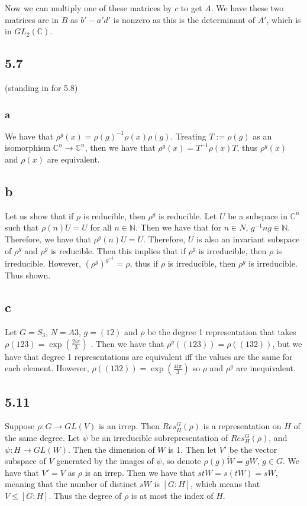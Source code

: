 \documentclass[]{article}
\begin{document}
Now we can multiply one of these matrices by $c$ to get $A$.
We have these two matrices are in $B$ as $b' - a' d' $ is nonzero as this is the determinant of $A'$, which is in $GL_2(\mathbb{C})$. 
\subsection*{5.7} (standing in for 5.8)

\subsubsection*{a}
We have that $\rho^g(x) = \rho(g)^{-1} \rho(x) \rho(g)$. Treating $T := \rho(g)$ as an isomorphism $\mathbb{C}^n \rightarrow \mathbb{C}^n$, then we have that $\rho^g(x) = T^{-1} \rho(x) T$, thus $\rho^g(x)$ and $\rho(x)$ are equivalent. 

\subsection*{b}
Let us show that if $\rho$ is reducible, then $\rho^g$ is reducible. Let $U$ be a subspace in $\mathbb{C}^n$ such that $\rho(n) U = U$ for all $n \in \mathbb{N}$. Then we have that for $n \in N$, $g^{-1} n g \in \mathbb{N}$. Therefore, we have that $\rho^g(n) U = U$. Therefore, $U$ is also an invariant subspace of $\rho^g$ and $\rho^g$ is reducible. Then this implies that if $\rho^g$ is irreducible, then $\rho$ is irreducible. However, $\left(\rho^g\right)^{g^{-1}} = \rho$, thus if $\rho$ is irreducible, then $\rho^g$ is irreducible. Thus shown. 
\subsection*{c}
Let $G = S_3$, $N = A3$, $g = (12)$ and $\rho$ be the degree 1 representation that takes $\rho(123) = \exp(\frac{2 i \pi}{3})$ . Then we have that $\rho^g((123)) = \rho((132))$, but we have that degree 1 representations are equivalent iff the values are the same for each element. However, $\rho((132)) = \exp(\frac{4 i \pi}{3})$ so $\rho$ and $\rho^g$ are inequivalent. 

\subsection*{5.11}
Suppose $\rho: G \rightarrow GL(V)$ is an irrep. Then $Res^G_H(\rho)$ is a representation on $H$ of the same degree. Let $\psi$ be an irreducible subrepresentation of $Res^G_H(\rho)$, and $\psi: H \rightarrow GL(W)$. Then the dimension of $W$ is 1. Then let $V'$ be the vector subspace of $V$ generated by the images of $\psi$, so denote $\rho(g) \dot W = gW$, $g \in G$. We have that $V' = V$ as $\rho$ is an irrep. Then we have that $stW = s (tW) = sW$, meaning that the number of distinct $sW$ is $[G : H]$, which means that $V \leq [G : H]$. Thus the degree of $\rho$ is at most the index of $H$. 
\end{document}
